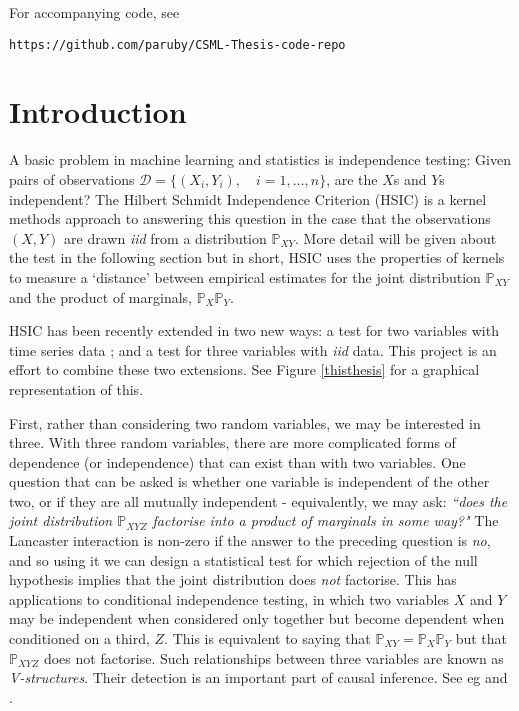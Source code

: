\documentclass[12pt]{article}
\numberwithin{claim}{section}
\numberwithin{lemma}{section}
\numberwithin{theorem}{section}
\begin{document}
\vspace{1cm}
For accompanying code, see
\begin{verbatim}
https://github.com/paruby/CSML-Thesis-code-repo
\end{verbatim}
\newpage
\newpage

\tableofcontents


\newpage
{}
\setcounter{page}{1}

\section{Introduction}



A basic problem in machine learning and statistics is independence testing: Given pairs of observations $\mathcal{D} = \{(X_i,Y_i),\quad i=1,\ldots, n\}$, are the $X$s and $Y$s independent? The Hilbert Schmidt Independence Criterion (HSIC) \cite{gretton2007kernel}\cite{gretton2005measuring} is a kernel methods approach to answering this question in the case that the observations $(X,Y)$ are drawn \emph{iid} from a distribution $\mathbb{P}_{XY}$. More detail will be given about the test in the following section but in short, HSIC uses the properties of kernels to measure a `distance' between empirical estimates for the joint distribution $\mathbb{P}_{XY}$ and the product of marginals,  $\mathbb{P}_{X}\mathbb{P}_{Y}$.



HSIC has been recently extended in two new ways: a test for two variables with time series data \cite{chwialkowski2014kernel}; and a test for three variables with \emph{iid} data\cite{sejdinovic2013kernel}. This project is an effort to combine these two extensions. See Figure \ref{thisthesis} for a graphical representation of this.

First, rather than considering two random variables, we may be interested in three. With three random variables, there are more complicated forms of dependence (or independence) that can exist than with two variables. One question that can be asked is whether one variable is independent of the other two, or if they are all mutually independent - equivalently, we may ask: \emph{``does the joint distribution $\mathbb{P}_{XYZ}$ factorise into a product of marginals in some way?"} The Lancaster interaction \cite{sejdinovic2013kernel}\cite{lancaster1969chi} is non-zero if the answer to the preceding question is \emph{no}, and so using it we can design a statistical test for which rejection of the null hypothesis implies that the joint distribution does \emph{not} factorise. This has applications to conditional independence testing, in which two variables $X$ and $Y$ may be independent when considered only together but become dependent when conditioned on a third, $Z$. This is equivalent to saying that $\mathbb{P}_{XY} = \mathbb{P}_X\mathbb{P}_Y$ but that $\mathbb{P}_{XYZ}$ does not factorise. Such relationships between three variables are known as \emph{V-structures}. Their detection is an important part of causal inference. See eg \cite{zhang2012kernel} and \cite{pearl2009causality}.
\end{document}
